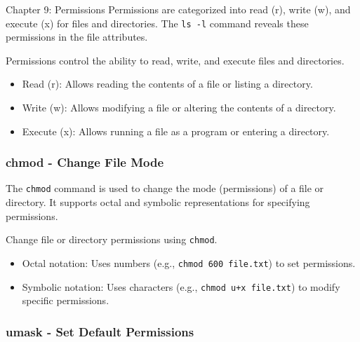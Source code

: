 \begin{notes}{Chapter 9: Permissions}
    Permissions are categorized into read (r), write (w), and execute (x) for files and directories. The \texttt{ls -l} command reveals these permissions in the file attributes.
    
    \begin{highlight}
    
    Permissions control the ability to read, write, and execute files and directories.
    
    \begin{itemize}
        \item Read (r): Allows reading the contents of a file or listing a directory.
        \item Write (w): Allows modifying a file or altering the contents of a directory.
        \item Execute (x): Allows running a file as a program or entering a directory.
    \end{itemize}
    
    \end{highlight}
    
    \subsubsection*{chmod - Change File Mode}
    
    The \texttt{chmod} command is used to change the mode (permissions) of a file or directory. It supports octal and symbolic representations for specifying permissions.
    
    \begin{highlight}
    
    Change file or directory permissions using \texttt{chmod}.
    
    \begin{itemize}
        \item Octal notation: Uses numbers (e.g., \texttt{chmod 600 file.txt}) to set permissions.
        \item Symbolic notation: Uses characters (e.g., \texttt{chmod u+x file.txt}) to modify specific permissions.
    \end{itemize}
    
    \end{highlight}
    
    \subsubsection*{umask - Set Default Permissions}
    

\end{notes}
